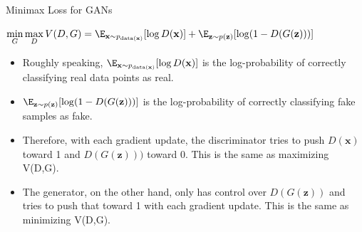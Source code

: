 \begin{frame} {Minimax Loss for GANs}
  \begin{tcolorbox}
    $\min \limits_G \max \limits_D V(D,G) = \E_{\mathbf{x}\sim p_{\text{data}(\mathbf{x})}}[\log D(\mathbf{x})] + \E_{\mathbf{z}\sim p(\mathbf{z})}[\log (1 - D(G(\mathbf{z})))]$
  \end{tcolorbox}
  \begin{itemize}
    \item Roughly speaking, $\E_{\mathbf{x}\sim p_{\text{data}(\mathbf{x})}}[\log D(\mathbf{x})]$ is the log-probability of correctly classifying real data points as real. 
  \vspace{2mm}
    \item $\E_{\mathbf{z}\sim p(\mathbf{z})}[\log (1 - D(G(\mathbf{z})))]$ is the log-probability of correctly classifying fake samples as fake.
  \vspace{2mm}
    \item Therefore, with each gradient update, the discriminator tries to push $D(\mathbf{x})$ toward 1 and $D(G(\mathbf{z})))$ toward 0. This is the same as maximizing V(D,G).
  \vspace{2mm}
    \item The generator, on the other hand, only has control over $D(G(\mathbf{z}))$ and tries to push that toward 1 with each gradient update. This is the same as minimizing V(D,G).
  \end{itemize}
\end{frame}

